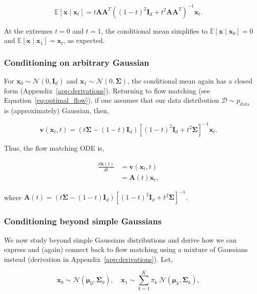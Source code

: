 $$
\mathbb{E}[\mathbf{x} \mid \mathbf{x}_t] = t \mathbf{A} \mathbf{A}^T \left( (1 - t)^2 \mathbf{I}_d + t^2 \mathbf{A} \mathbf{A}^T \right)^{-1}\mathbf{x}_t.
$$

At the extremes $t = 0$ and $t = 1$, the conditional mean simplifies to $\mathbb{E}[\mathbf{x} \mid \mathbf{x}_0] = 0$ and $\mathbb{E}[\mathbf{x} \mid \mathbf{x}_1] = \mathbf{x}_t$, as expected.

\subsubsection{Conditioning on arbitrary Gaussian}
For $\mathbf{x}_0 \sim \mathcal{N}(0, \mathbf{I}_d)$ and $\mathbf{x}_1 \sim \mathcal{N}(0, \boldsymbol \Sigma)$, the conditional mean again has a closed form (Appendix~\ref{app:derivations}). Returning to flow matching (see Equation~\eqref{eq:optimal_flow}), if one assumes that our data distribution $\mathcal{D} \sim p_{\text{data}}$ is (approximately) Gaussian, then,

\begin{equation*}
\mathbf{v}(\mathbf{x}_t,t) %
= (t \boldsymbol \Sigma - (1 - t) \mathbf{I}_d)[(1 - t)^2 \mathbf{I}_d + t^2 \boldsymbol \Sigma]^{-1} \mathbf{x}_t.
\end{equation*}

Thus, the flow matching ODE is,

\begin{align*}
\frac{d\mathbf{x}(t)}{dt} & = \mathbf{v}(\mathbf{x}_t, t) \\
& = \mathbf{A}(t) \mathbf{x}_t,
\end{align*}

where $\mathbf{A}(t) = (t \boldsymbol \Sigma - (1 - t) \mathbf{I}_d)[(1 - t)^2 \mathbf{I}_d + t^2 \boldsymbol \Sigma]^{-1}$.

\subsubsection{Conditioning beyond simple Gaussians}
We now study beyond simple Gaussians distributions and derive how we can express and (again) connect back to flow matching using a mixture of Gaussians instead (derivation in Appendix~\ref{app:derivations}). Let,

$$
\mathbf{x}_0 \sim \mathcal N(\boldsymbol \mu_0, \boldsymbol \Sigma_0), \quad \mathbf{x}_1 \sim \sum_{k=1}^K \pi_k \ \mathcal N(\boldsymbol \mu_k, \boldsymbol \Sigma_k),
$$

